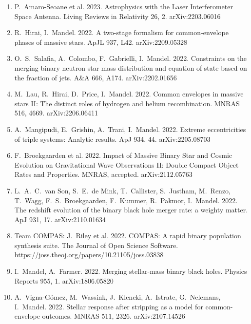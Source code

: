 \documentclass[margin,line]{res}
\begin{document}
\begin{resume}
\begin{enumerate}
\item P.~Amaro-Seoane et al. 2023.  Astrophysics with the Laser Interferometer Space Antenna.  Living Reviews in Relativity 26, 2.  arXiv:2203.06016

\item R.~Hirai, I.~Mandel. 2022.  A two-stage formalism for common-envelope phases of massive stars.  ApJL 937, L42.  arXiv:2209.05328

\item O.~S.~Salafia, A.~Colombo, F.~Gabrielli, I.~Mandel. 2022. Constraints on the merging binary neutron star mass distribution and equation of state based on the fraction of jets.  A\&A 666, A174. arXiv:2202.01656

\item M.~Lau, R.~Hirai, D.~Price, I.~Mandel.  2022.  Common envelopes in massive stars II: The distinct roles of hydrogen and helium recombination.  MNRAS 516, 4669. arXiv:2206.06411 

\item A.~Mangipudi, E.~Grishin, A.~Trani, I.~Mandel. 2022. Extreme eccentricities of triple systems: Analytic results.  ApJ 934, 44.  arXiv:2205.08703

\item F.~Broekgaarden et al.  2022.  Impact of Massive Binary Star and Cosmic Evolution on Gravitational Wave Observations II: Double Compact Object Rates and Properties.  MNRAS, accepted.  arXiv:2112.05763

\item L.~A.~C.~van Son, S.~E.~de Mink, T.~Callister, S.~Justham, M.~Renzo, T.~Wagg, F.~S.~Broekgaarden, F.~Kummer, R.~Pakmor, I.~Mandel.  2022.  The redshift evolution of the binary black hole merger rate: a weighty matter.  ApJ 931, 17.  arXiv:2110.01634 

\item Team COMPAS: J.~Riley et al. 2022.  COMPAS: A rapid binary population synthesis suite.  The Journal of Open Science Software.  https://joss.theoj.org/papers/10.21105/joss.03838

\item I.~Mandel, A.~Farmer.  2022.  Merging stellar-mass binary black holes.  Physics Reports 955, 1.  arXiv:1806.05820

\item A.~Vigna-G\'{o}mez, M.~Wassink, J.~Klencki, A.~Istrate, G.~Nelemans, I.~Mandel.  2022. Stellar response after stripping as a model for common-envelope outcomes. MNRAS 511, 2326.  arXiv:2107.14526


\end{enumerate}
\end{resume}
\end{document}
